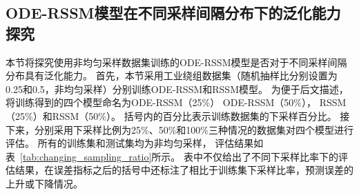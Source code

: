 \subsection{ODE-RSSM模型在不同采样间隔分布下的泛化能力探究}
本节将探究使用非均匀采样数据集训练的ODE-RSSM模型是否对于不同采样间隔分布具有泛化能力。
首先，本节采用工业绕组数据集（随机抽样比分别设置为0.25和0.5，非均匀采样）分别训练ODE-RSSM和RSSM模型。
为便于后文描述，将训练得到的四个模型命名为ODE-RSSM（25\%） ODE-RSSM（50\%）， RSSM（25\%）和RSSM（50\%）。
括号内的百分比表示训练数据集的下采样百分比。
接下来，分别采用下采样比例为25\%、50\%和100\%三种情况的数据集对四个模型进行评估。
所有的训练集和测试集均为非均匀采样，
评估结果如表~\ref{tab:changing_sampling_ratio}所示。
表中不仅给出了不同下采样比率下的评估结果，在误差指标之后的括号中还标注了相比于训练集下采样比率，预测误差的上升或下降情况。
